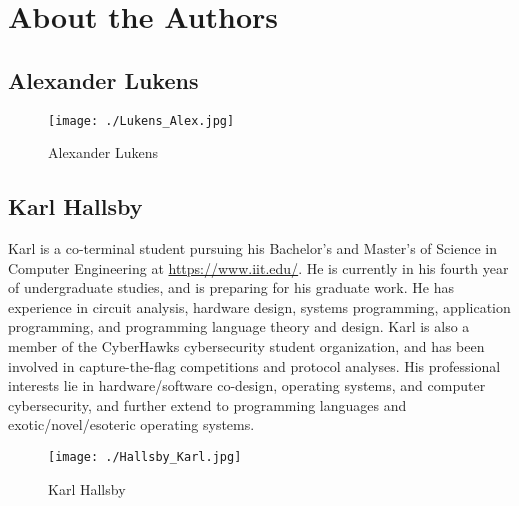 \chapter{About the Authors}\label{chap:About_Authors}
\section*{Alexander Lukens}\label{sec:Alexander_Lukens}
\begin{figure}[h!tbp]
  \centering
  \texttt{[image: ./Lukens\_Alex.jpg]}
  \caption*{Alexander Lukens}
  \label{fig:Alexander_Lukens}
\end{figure}

\section*{Karl Hallsby}\label{sec:Karl_Hallsby}
Karl is a co-terminal student pursuing his Bachelor's and Master's of Science in Computer Engineering at \href{Illinois Institute of Technology}{https://www.iit.edu/}.
He is currently in his fourth year of undergraduate studies, and is preparing for his graduate work.
He has experience in circuit analysis, hardware design, systems programming, application programming, and programming language theory and design.
Karl is also a member of the CyberHawks cybersecurity student organization, and has been involved in capture-the-flag competitions and protocol analyses.
His professional interests lie in hardware/software co-design, operating systems, and computer cybersecurity, and further extend to programming languages and exotic/novel/esoteric operating systems.

\begin{figure}[h!tbp]
  \centering
  \texttt{[image: ./Hallsby\_Karl.jpg]}
  \caption*{Karl Hallsby}
  \label{fig:Karl_Hallsby}
\end{figure}

